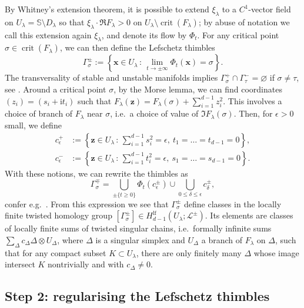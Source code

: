 \documentclass[11pt, a4paper]{article}
\numberwithin{theorem}{section}
\theoremstyle{remark}
\DeclareMathOperator{\crit}{crit}
\renewcommand{\L}{\mathcal{L}}
\renewcommand{\Re}{\mathfrak{R}}
\renewcommand{\Im}{\mathfrak{I}}
\newcommand{\bb}[1]{\boldsymbol{#1}}
\newcommand{\lf}{\mathrm{lf}}
\newcommand{\Sc}{\mathbb{S}}
\renewcommand{\i}{\mathrm{i}}
\theoremstyle{theorem}
\begin{document}
By Whitney's extension theorem, it is possible to extend $\xi_\lambda$ to a $C^1$-vector field on $U_\lambda = \Sc \setminus D_\lambda$ so that $\xi_\lambda \cdot \Re F_\lambda > 0$ on $U_\lambda\setminus \crit(F_\lambda)$; by abuse of notation we call this extension again $\xi_\lambda$, and denote its flow by $\Phi_t$. For any critical point $\sigma\in \crit(F_\lambda)$, we can then define the Lefschetz thimbles
\[
  \Gamma^{\pm}_\sigma := \left\{ \bb{x} \in U_\lambda \,:\, \lim_{t\to\pm\infty} \Phi_t(\bb{x}) = \sigma \right\}.
\]
The transversality of stable and unstable manifolds implies $\Gamma^+_\sigma \cap \Gamma^-_\tau = \varnothing$ if $\sigma \neq \tau$, see \cite[Remark 2.4.9]{MorseTheoryInvitation}. Around a critical point $\sigma$, by the Morse lemma, we can find coordinates $(z_i) = (s_i + \i t_i)$ such that $F_\lambda(\bb{z}) = F_\lambda(\sigma) + \sum_{i=1}^{d-1} z_i^2$. This involves a choice of branch of $F_\lambda$ near $\sigma$, i.e.\ a choice of value of $\Im F_\lambda(\sigma)$. Then, for $\epsilon > 0$ small, we define
\begin{equation}
  \begin{aligned}
  \label{eq:def_c_eps}
  c_\epsilon^+ & := \left\{ \bb{z} \in U_\lambda \,:\, \sum_{i=1}^{d-1} s_i^2 = \epsilon,~ t_1=\dots =t_{d-1}=0 \right\}, \\
  c_\epsilon^- & := \left\{ \bb{z} \in U_\lambda \,:\, \sum_{i=1}^{d-1} t_i^2 = \epsilon,~ s_1=\dots =s_{d-1}=0 \right\}.
\end{aligned}
\end{equation} 
With these notions, we can rewrite the thimbles as 
\[
  \Gamma^{\mp}_\sigma = \bigcup_{\pm \{t\geq 0\}} \Phi_t(c_\epsilon^\pm) \cup \bigcup_{0 \leq \delta\leq \epsilon} c^\pm_\delta,
\]
confer e.g.\ \cite[\S 2.3.1]{delabaere2002global}. From this expression we see that $\Gamma^\pm_\sigma$ define classes in the locally finite twisted homology group $[\Gamma^\pm_\sigma] \in H^{\lf}_{d-1}(U_\lambda;\L^\pm)$. Its elements are classes of locally finite sums of twisted singular chains, i.e.\ formally infinite sums $\sum_{\Delta} c_\Delta \Delta\otimes U_\Delta$, where $\Delta$ is a singular simplex and $U_\Delta$ a branch of $F_\lambda$ on $\Delta$, such that for any compact subset $K\subset U_\lambda$, there are only finitely many $\Delta$ whose image intersect $K$ nontrivially and with $c_\Delta \neq 0$.

\subsection{Step 2: regularising the Lefschetz thimbles}
\end{document}
